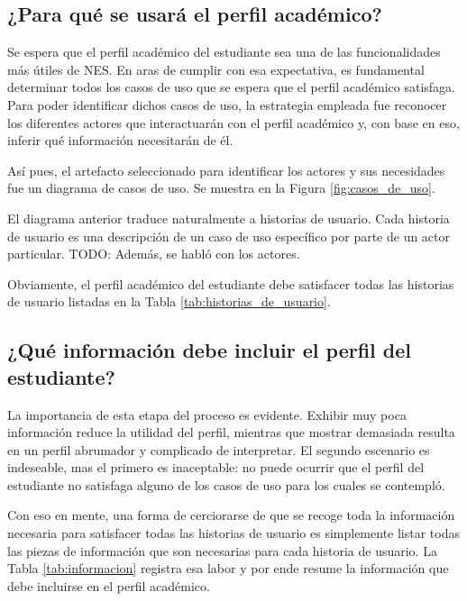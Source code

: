 \subsection{¿Para qué se usará el perfil académico?}

Se espera que el perfil académico del estudiante sea una de las funcionalidades más útiles de \gls{NES}. En aras de cumplir con esa expectativa, es fundamental determinar todos los casos de uso que se espera que el perfil académico satisfaga. Para poder identificar dichos casos de uso, la estrategia empleada fue reconocer los diferentes actores que interactuarán con el perfil académico y, con base en eso, inferir qué información necesitarán de él.

Así pues, el artefacto seleccionado para identificar los actores y sus necesidades fue un diagrama de casos de uso. Se muestra en la Figura \ref{fig:casos_de_uso}.


El diagrama anterior traduce naturalmente a historias de usuario. Cada historia de usuario es una descripción de un caso de uso específico por parte de un actor particular.
TODO: Además, se habló con los actores.

Obviamente, el perfil académico del estudiante debe satisfacer todas las historias de usuario listadas en la Tabla \ref{tab:historias_de_usuario}.

\subsection{¿Qué información debe incluir el perfil del estudiante?}

La importancia de esta etapa del proceso es evidente. Exhibir muy poca información reduce la utilidad del perfil, mientras que mostrar demasiada resulta en un perfil abrumador y complicado de interpretar. El segundo escenario es indeseable, mas el primero es inaceptable: no puede ocurrir que el perfil del estudiante no satisfaga alguno de los casos de uso para los cuales se contempló.

Con eso en mente, una forma de cerciorarse de que se recoge toda la información necesaria para satisfacer todas las historias de usuario es simplemente listar todas las piezas de información que son necesarias para cada historia de usuario. La Tabla \ref{tab:informacion} registra esa labor y por ende resume la información que debe incluirse en el perfil académico.

